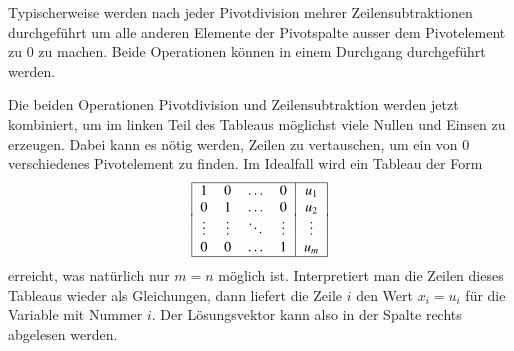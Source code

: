 Typischerweise werden nach jeder Pivotdivision mehrer Zeilensubtraktionen
durchgeführt um alle anderen Elemente der Pivotspalte ausser dem
Pivotelement zu $0$ zu machen.
Beide Operationen können in einem Durchgang durchgeführt werden.

Die beiden Operationen Pivotdivision und Zeilensubtraktion werden jetzt
kombiniert, um im linken Teil des Tableaus möglichst viele Nullen und
Einsen zu erzeugen.
Dabei kann es nötig werden, Zeilen zu vertauschen, um ein von $0$
verschiedenes Pivotelement zu finden.
Im Idealfall wird ein Tableau der Form
\[
\begin{tabular}{|>{$}c<{$}>{$}c<{$}>{$}c<{$}>{$}c<{$}|>{$}c<{$}|}
\hline
     1&     0&\dots &     0&u_1   \\
     0&     1&\dots &     0&u_2   \\[-2pt]
\vdots&\vdots&\ddots&\vdots&\vdots\\
     0&     0&\dots &     1&u_m   \\
\hline
\end{tabular}
\]
erreicht, was natürlich nur $m=n$ möglich ist.
Interpretiert man die Zeilen dieses Tableaus wieder als Gleichungen,
dann liefert die Zeile $i$ den Wert $x_i=u_i$ für die Variable
mit Nummer $i$.
Der Lösungsvektor kann also in der Spalte rechts abgelesen werden.

